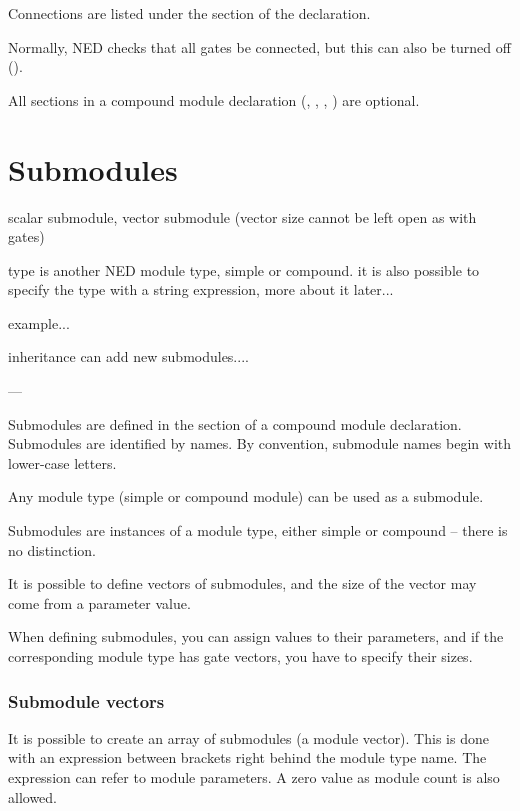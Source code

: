 Connections are listed under the  section of the
declaration.

Normally, NED checks that all gates be connected, but this can also
be turned off ().

All sections in a compound module declaration (,
, , ) are optional.


\section{Submodules}

scalar submodule, vector submodule (vector size cannot be left open as with gates)

type is another NED module type, simple or compound. it is also possible
to specify the type with a string expression, more about it later...

example...

inheritance can add new submodules....

---

Submodules are defined in the
 section of a compound
module declaration. Submodules are identified by names.
By convention, submodule names begin with lower-case letters.

Any module type (simple or compound module) can be
used as a submodule.

Submodules are instances of a module type, either simple
or compound -- there is no distinction.

It is possible to define vectors of submodules, and the
size of the vector may come from a parameter value.

When defining submodules, you can assign values to their
parameters, and if the corresponding module type has gate vectors,
you have to specify their sizes.


\subsubsection{Submodule vectors}

It is possible to create an array of
submodules (a module
vector).  This is done with an expression between
brackets right behind the module type name. The expression can refer
to module parameters. A zero value as module count is also allowed.

